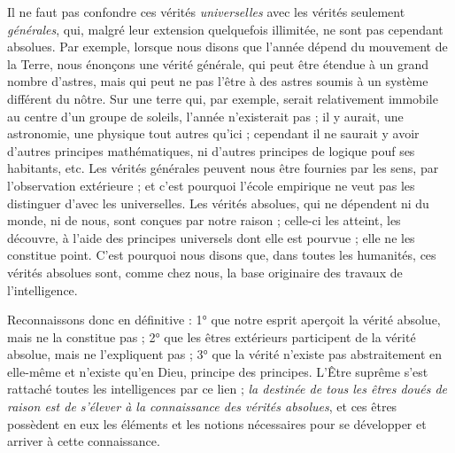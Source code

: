 \documentclass[a4paper, 11pt, oneside]{article}
\begin{document}
Il ne faut pas confondre ces vérités \emph{universelles} avec les vérités seulement \emph{générales}, qui, malgré leur extension quelquefois illimitée, ne sont pas cependant absolues. Par exemple, lorsque nous disons que l'année dépend du mouvement de la Terre, nous énonçons une vérité générale, qui peut être étendue à un grand nombre d'astres, mais qui peut ne pas l'être à des astres soumis à un système différent du nôtre. Sur une terre qui, par exemple, serait relativement immobile au centre d'un groupe de soleils, l'année n'existerait pas ; il y aurait, une astronomie, une physique tout autres qu'ici ; cependant il ne saurait y avoir d'autres principes mathématiques, ni d'autres principes de logique pouf ses habitants, etc. Les vérités générales peuvent nous être fournies par les sens, par l'observation extérieure ; et c'est pourquoi l'école empirique ne veut pas les distinguer d'avec les universelles. Les vérités absolues, qui ne dépendent ni du monde, ni de nous, sont conçues par notre raison ; celle-ci les atteint, les découvre, à l'aide des principes universels dont elle est pourvue ; elle ne les constitue point. C'est pourquoi nous disons que, dans toutes les humanités, ces vérités absolues sont, comme chez nous, la base originaire des travaux de l'intelligence.

Reconnaissons donc en définitive : 1° que notre esprit aperçoit la vérité absolue, mais ne la constitue pas ; 2° que les êtres extérieurs participent de la vérité absolue, mais ne l'expliquent pas ; 3° que la vérité n'existe pas abstraitement en elle-même et n'existe qu'en Dieu, principe des principes. L'Être suprême s'est rattaché toutes les intelligences par ce lien ; \emph{la destinée de tous les êtres doués de raison est de s'élever à la connaissance des vérités absolues}, et ces êtres possèdent en eux les éléments et les notions nécessaires pour se développer et arriver à cette connaissance.
\end{document}
